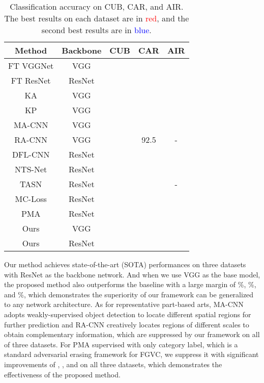 \documentclass{article}
\begin{document}
\begin{table}[!t]
  \centering
  \caption{Classification accuracy on CUB, CAR, and AIR. The best results on each dataset are in \textcolor{red}{red}, and the second best results are in \textcolor{blue}{blue}.}
  \vspace{+0.3cm}
    \begin{tabular}{|c|c|c|c|c|}
    \hline
 Method  & Backbone & \multicolumn{1}{l|}{CUB} & \multicolumn{1}{l|}{CAR} & \multicolumn{1}{l|}{AIR}\\
 \hline
 \hline
FT VGGNet \cite{wang2018learning} & VGG &  &  &  \\
FT ResNet \cite{wang2018learning} & ResNet &  &  &  \\
KA \cite{cai2017higher} & VGG &  &  &  \\
KP \cite{cui2017kernel} & VGG &  &  &  \\
MA-CNN \cite{zheng2017learning} & VGG &  &  &  \\
RA-CNN \cite{fu2017look} & VGG &  & 92.5 & - \\
DFL-CNN \cite{wang2018learning} & ResNet &  &  &  \\
NTS-Net \cite{yang2018learning} & ResNet &  & \textcolor{blue}{} &  \\
TASN \cite{8953519} & ResNet &  \textcolor{blue}{} &  & - \\
MC-Loss \cite{chang2019the} & ResNet &  &  & \textcolor{blue}{} \\
PMA \cite{9103943} & ResNet &  &  &  \\
   \hline
   \hline
Ours & VGG &  &  &  \\
Ours & ResNet &  \textcolor{red}{} & \textcolor{red}{} & \textcolor{red}{} \\
   \hline
    \end{tabular}\label{tab:sota}\end{table}

Our method achieves state-of-the-art (SOTA) performances on three datasets with ResNet as the backbone network. And when we use VGG as the base model, the proposed method also outperforms the baseline with a large margin of \%, \%, and \%, which demonstrates the superiority of our framework can be generalized to any network architecture. As for representative part-based arts, MA-CNN \cite{zheng2017learning} adopts weakly-supervised object detection to locate different spatial regions for further prediction and RA-CNN \cite{fu2017look} creatively locates regions of different scales to obtain complementary information, which are suppressed by our framework on all of three datasets. For PMA \cite{9103943} supervised with only category label, which is a standard adversarial erasing framework for FGVC, we suppress it with significant improvements of , , and  on all three datasets, which demonstrates the effectiveness of the proposed method. 
\end{document}
